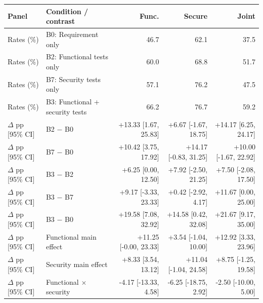 \begin{tabular}{llrrr}
\toprule
Panel & Condition / contrast & Func. & Secure & Joint \\
\midrule
Rates (\%) & B0: Requirement only & 46.7 & 62.1 & 37.5 \\
Rates (\%) & B2: Functional tests only & 60.0 & 68.8 & 51.7 \\
Rates (\%) & B7: Security tests only & 57.1 & 76.2 & 47.5 \\
Rates (\%) & B3: Functional + security tests & 66.2 & 76.7 & 59.2 \\
\midrule
$\Delta$ pp [95\% CI] & B2 $-$ B0 & +13.33 [1.67, 25.83] & +6.67 [-1.67, 18.75] & +14.17 [6.25, 24.17] \\
$\Delta$ pp [95\% CI] & B7 $-$ B0 & +10.42 [3.75, 17.92] & +14.17 [-0.83, 31.25] & +10.00 [-1.67, 22.92] \\
$\Delta$ pp [95\% CI] & B3 $-$ B2 & +6.25 [0.00, 12.50] & +7.92 [-2.50, 21.25] & +7.50 [-2.08, 17.50] \\
$\Delta$ pp [95\% CI] & B3 $-$ B7 & +9.17 [-3.33, 23.33] & +0.42 [-2.92, 4.17] & +11.67 [0.00, 25.00] \\
$\Delta$ pp [95\% CI] & B3 $-$ B0 & +19.58 [7.08, 32.92] & +14.58 [0.42, 32.08] & +21.67 [9.17, 35.00] \\
$\Delta$ pp [95\% CI] & Functional main effect & +11.25 [-0.00, 23.33] & +3.54 [-1.04, 10.00] & +12.92 [3.33, 23.96] \\
$\Delta$ pp [95\% CI] & Security main effect & +8.33 [3.54, 13.12] & +11.04 [-1.04, 24.58] & +8.75 [-1.25, 19.58] \\
$\Delta$ pp [95\% CI] & Functional $\times$ security & -4.17 [-13.33, 4.58] & -6.25 [-18.75, 2.92] & -2.50 [-10.00, 5.00] \\
\bottomrule
\end{tabular}

